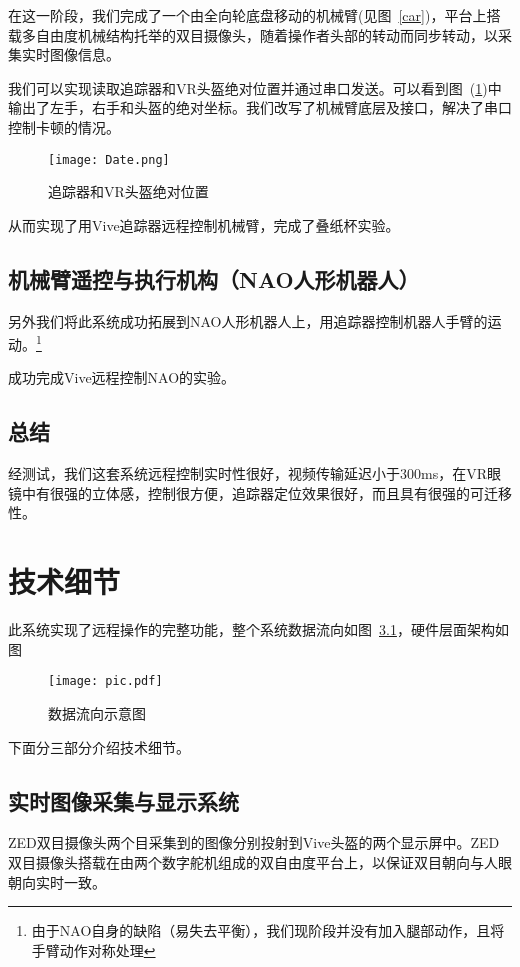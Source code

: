 在这一阶段，我们完成了一个由全向轮底盘移动的机械臂(见图~\ref{car})，平台上搭载多自由度机械结构托举的双目摄像头，随着操作者头部的转动而同步转动，以采集实时图像信息。

我们可以实现读取追踪器和VR头盔绝对位置并通过串口发送。可以看到图~(\ref{POS})中输出了左手，右手和头盔的绝对坐标。我们改写了机械臂底层及接口，解决了串口控制卡顿的情况。
\begin{figure}[htbp]
\small
\centering
\texttt{[image: Date.png]}
\caption{追踪器和VR头盔绝对位置} 
\label{POS}
\end{figure}

从而实现了用Vive追踪器远程控制机械臂，完成了叠纸杯实验。

\section{机械臂遥控与执行机构（NAO人形机器人）}
另外我们将此系统成功拓展到NAO人形机器人上，用追踪器控制机器人手臂的运动。\footnote{由于NAO自身的缺陷（易失去平衡），我们现阶段并没有加入腿部动作，且将手臂动作对称处理}

成功完成Vive远程控制NAO的实验。



\section{总结}

经测试，我们这套系统远程控制实时性很好，视频传输延迟小于300ms，在VR眼镜中有很强的立体感，控制很方便，追踪器定位效果很好，而且具有很强的可迁移性。



\chapter{技术细节}

此系统实现了远程操作的完整功能，整个系统数据流向如图~\ref{pic}，硬件层面架构如图
\begin{figure}[htbp]
\small
\centering
\texttt{[image: pic.pdf]}
\caption{数据流向示意图} 
\label{pic}
\end{figure}

下面分三部分介绍技术细节。

\section{实时图像采集与显示系统}
ZED双目摄像头两个目采集到的图像分别投射到Vive头盔的两个显示屏中。ZED双目摄像头搭载在由两个数字舵机组成的双自由度平台上，以保证双目朝向与人眼朝向实时一致。

